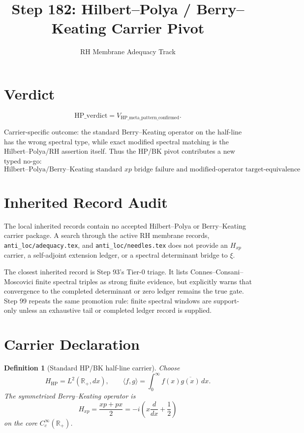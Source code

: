 \documentclass[11pt]{article}
\title{Step 182: Hilbert--Polya / Berry--Keating Carrier Pivot}
\author{RH Membrane Adequacy Track}
\date{}
\newtheorem{definition}{Definition}
\newcommand{\R}{\mathbb R}
\newcommand{\Hp}{H_{\mathrm{HP}}}
\newcommand{\Hxp}{H_{xp}}
\begin{document}
\maketitle

\section*{Verdict}

\[
\boxed{\mathrm{HP\_verdict}=V_{\mathrm{HP\_meta\_pattern\_confirmed}}.}
\]

Carrier-specific outcome: the standard Berry--Keating operator on the
half-line has the wrong spectral type, while exact modified spectral matching
is the Hilbert--Polya/RH assertion itself.  Thus the HP/BK pivot contributes a
new typed no-go:
\[
\boxed{\text{Hilbert--Polya/Berry--Keating standard \(xp\) bridge failure and modified-operator target-equivalence}.}
\]

\section*{Inherited Record Audit}

The local inherited records contain no accepted Hilbert--Polya or
Berry--Keating carrier package.  A search through the active RH membrane
records, \texttt{anti\_loc/adequacy.tex}, and \texttt{anti\_loc/needles.tex}
does not provide an \(H_{xp}\) carrier, a self-adjoint extension ledger, or a
spectral determinant bridge to \(\xi\).

The closest inherited record is Step 93's Tier-0 triage.  It lists
Connes--Consani--Moscovici finite spectral triples as strong finite evidence,
but explicitly warns that convergence to the completed determinant or zero
ledger remains the true gate.  Step 99 repeats the same promotion rule:
finite spectral windows are support-only unless an exhaustive tail or
completed ledger record is supplied.

\section*{Carrier Declaration}

\begin{definition}[Standard HP/BK half-line carrier]
Choose
\[
\Hp=L^2(\R_+,dx),\qquad
\langle f,g\rangle=\int_0^\infty f(x)\overline{g(x)}\,dx.
\]
The symmetrized Berry--Keating operator is
\[
\Hxp=\frac{xp+px}{2}
     =-i\left(x\frac{d}{dx}+\frac12\right)
\]
on the core \(C_c^\infty(\R_+)\).
\end{definition}
\end{document}
